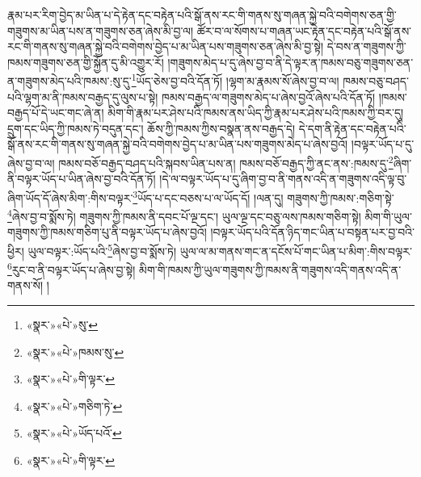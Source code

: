 རྣམ་པར་རིག་བྱེད་མ་ཡིན་པ་དེ་རྟེན་དང་བརྟེན་པའི་སྒོ་ནས་རང་གི་གནས་སུ་གཞན་སྐྱེ་བའི་བགེགས་ཅན་གྱི་གཟུགས་མ་ཡིན་པས་ན་གཟུགས་ཅན་ཞེས་མི་བྱ་ལ། ཚོར་བ་ལ་སོགས་པ་གཞན་ཡང་རྟེན་དང་བརྟེན་པའི་སྒོ་ནས་རང་གི་གནས་སུ་གཞན་སྐྱེ་བའི་བགེགས་བྱེད་པ་མ་ཡིན་པས་གཟུགས་ཅན་ཞེས་མི་བྱ་སྟེ། དེ་བས་ན་གཟུགས་ཀྱི་ཁམས་གཟུགས་ཅན་གྱི་སྐྱོན་དུ་མི་འགྱུར་རོ། །གཟུགས་མེད་པ་དུ་ཞེས་བྱ་བ་ནི་དེ་ལྟར་ན་ཁམས་བཅུ་གཟུགས་ཅན་ན་གཟུགས་མེད་པའི་ཁམས་:སུ་དུ་\footnote{«སྣར་»«པེ་»སུ་}ཡོད་ཅེས་བྱ་བའི་དོན་ཏོ། །ལྷག་མ་རྣམས་སོ་ཞེས་བྱ་བ་ལ། ཁམས་བཅུ་བཤད་པའི་ལྷག་མ་ནི་ཁམས་བརྒྱད་དུ་ལུས་པ་སྟེ། ཁམས་བརྒྱད་ལ་གཟུགས་མེད་པ་ཞེས་བྱའོ་ཞེས་པའི་དོན་ཏོ། །ཁམས་བརྒྱད་པོ་དེ་ཡང་གང་ཞེ་ན། མིག་གི་རྣམ་པར་ཤེས་པའི་ཁམས་ནས་ཡིད་ཀྱི་རྣམ་པར་ཤེས་པའི་ཁམས་ཀྱི་བར་དུ། དྲུག་དང་ཡིད་ཀྱི་ཁམས་ཏེ་བདུན་དང་། ཆོས་ཀྱི་ཁམས་ཀྱིས་བསྣན་ནས་བརྒྱད་དེ། དེ་དག་ནི་རྟེན་དང་བརྟེན་པའི་སྒོ་ནས་རང་གི་གནས་སུ་གཞན་སྐྱེ་བའི་བགེགས་བྱེད་པ་མ་ཡིན་པས་གཟུགས་མེད་པ་ཞེས་བྱའོ། །བལྟར་ཡོད་པ་དུ་ཞེས་བྱ་བ་ལ། ཁམས་བཅོ་བརྒྱད་བཤད་པའི་སྐབས་ཡིན་པས་ན། ཁམས་བཅོ་བརྒྱད་ཀྱི་ནང་ནས་:ཁམས་དུ་\footnote{«སྣར་»«པེ་»ཁམས་སུ་}ཞིག་ནི་བལྟར་ཡོད་པ་ཡིན་ཞེས་བྱ་བའི་དོན་ཏོ། །དེ་ལ་བལྟར་ཡོད་པ་དུ་ཞིག་བྱ་བ་ནི་གནས་འདི་ན་གཟུགས་འདི་ལྟ་བུ་ཞིག་ཡོད་དོ་ཞེས་མིག་:གིས་བལྟར་\footnote{«སྣར་»«པེ་»གི་ལྟར་}ཡོད་པ་དང་བཅས་པ་ལ་ཡོད་དོ། །ལན་དུ། གཟུགས་ཀྱི་ཁམས་:གཅིག་སྟེ་\footnote{«སྣར་»«པེ་»གཅིག་ཏེ་}ཞེས་བྱ་བ་སྨོས་ཏེ། གཟུགས་ཀྱི་ཁམས་ནི་དབང་པོ་ལྔ་དང་། ཡུལ་ལྔ་དང་བཅུ་ལས་ཁམས་གཅིག་སྟེ། མིག་གི་ཡུལ་གཟུགས་ཀྱི་ཁམས་གཅིག་པུ་ནི་བལྟར་ཡོད་པ་ཞེས་བྱའོ། །བལྟར་ཡོད་པའི་དོན་ཉིད་གང་ཡིན་པ་བསྟན་པར་བྱ་བའི་ཕྱིར། ཡུལ་བལྟར་:ཡོད་པའི་\footnote{«སྣར་»«པེ་»ཡོད་པའོ་}ཞེས་བྱ་བ་སྨོས་ཏེ། ཡུལ་ལ་མ་གནས་གང་ན་དངོས་པོ་གང་ཡིན་པ་མིག་:གིས་བལྟར་\footnote{«སྣར་»«པེ་»གི་ལྟར་}རུང་བ་ནི་བལྟར་ཡོད་པ་ཞེས་བྱ་སྟེ། མིག་གི་ཁམས་ཀྱི་ཡུལ་གཟུགས་ཀྱི་ཁམས་ནི་གཟུགས་འདི་གནས་འདི་ན་གནས་སོ། །
